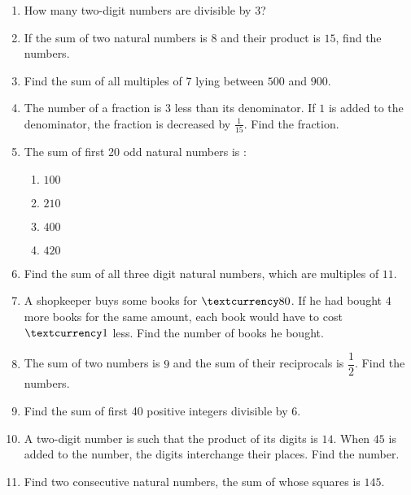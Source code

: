 \begin{enumerate}
\item How many two-digit numbers are divisible by 3?\\
\item If the sum of two natural numbers is $8$ and their product is $15$, find the numbers.\\
\item Find the sum of all multiples of 7 lying between $500$ and $900$.\\
\item The number of a fraction is $3$ less than its denominator. If $1$ is added to the denominator, the fraction is decreased by $\frac{1}{15}$. Find the fraction.\\
\item The sum of first 20 odd natural numbers is :\\
\begin{enumerate}
\item $100$\\
\item $210$\\
\item $400$\\
\item $420$\\
\end{enumerate}
\item Find the sum of all three digit natural numbers, which are multiples of $11$.\\
\item A shopkeeper buys some books for $\textcurrency 80$. If he had bought $4$ more books for the same amount, each book would have to cost $\textcurrency 1$ less. Find the number of books he bought.\\

\item The sum of two numbers is $9$ and the sum of their reciprocals is $\dfrac{1}{2}$. Find the numbers.\\
\item Find the sum of first 40 positive integers divisible by $6$.\\
\item A two-digit number is such that the product of its digits is $14$. When $45$ is added to the number, the digits interchange their places. Find the number.\\
\item Find two consecutive natural numbers, the sum of whose squares is $145$.\\
\end{enumerate}

